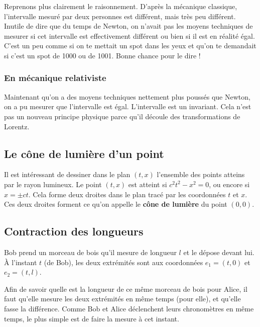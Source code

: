 \documentclass[a4paper,12pt]{book}
\theoremstyle{mes_exemples}	\newtheorem{exemple}[numtho]{Exemple}
\theoremstyle{mes_tho}
\newcommand{\defe}[2]{\textbf{#1}\index{#2}}
\begin{document}
Reprenons plus clairement le raisonnement. D'après la mécanique classique, l'intervalle mesuré par deux personnes est différent, mais très peu différent. Inutile de dire que du temps de Newton, on n'avait pas les moyens techniques de mesurer si cet intervalle est effectivement différent ou bien si il est en réalité égal. C'est un peu comme si on te mettait un spot dans les yeux et qu'on te demandait si c'est un spot de \unit{1000}{\watt} ou de \unit{1001}{\watt}. Bonne chance pour le dire !

\subsubsection{En mécanique relativiste}

 Maintenant qu'on a des moyens techniques nettement plus poussés que Newton, on a pu mesurer que l'intervalle est égal. L'intervalle est un invariant. Cela n'est pas un nouveau principe physique parce qu'il découle des transformations de Lorentz.


\subsection{Le cône de lumière d'un point}


Il est intéressant de dessiner dans le plan $(t,x)$ l'ensemble des points atteins par le rayon lumineux. Le point $(t,x)$ est atteint si $c^2t^2-x^2=0$, ou encore si $x=\pm ct$. Cela forme deux droites dans le plan tracé par les coordonnées $t$ et $x$. Ces deux droites forment ce qu'on appelle le \defe{cône de lumière}{Cône de lumière} du point $(0,0)$.

\subsection{Contraction des longueurs}

Bob prend un morceau de bois qu'il mesure de longueur $l$ et le dépose devant lui. À l'instant $t$ (de Bob), les deux extrémités sont aux coordonnées $e_1=(t,0)$ et $e_2=(t,l)$. 

Afin de savoir quelle est la longueur de ce même morceau de bois pour Alice, il faut qu'elle mesure les deux extrémités en même temps (pour elle), et qu'elle fasse la différence. Comme Bob et Alice déclenchent leurs chronomètres en même temps, le plus simple est de faire la mesure à cet instant.
\end{document}
